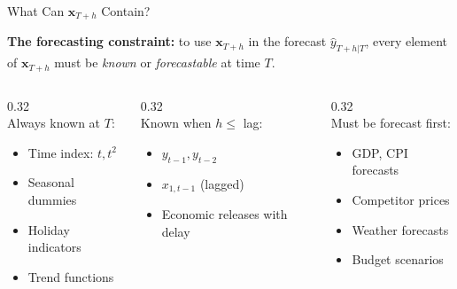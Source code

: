 \documentclass[aspectratio=169, 11pt]{beamer}
\begin{document}
\begin{frame}{What Can $\mathbf{x}_{T+h}$ Contain?}
  \begin{keybox}
    \textbf{The forecasting constraint:} to use $\mathbf{x}_{T+h}$ in the forecast
    $\hat{y}_{T+h|T}$, every element of $\mathbf{x}_{T+h}$ must be
    \emph{known} or \emph{forecastable} at time $T$.
  \end{keybox}
  \vspace{0.2cm}
  \begin{columns}[T]
    \begin{column}{0.32\textwidth}
      \textbf{}\\[4pt]
      Always known at $T$:
      \begin{itemize}
        \item Time index: $t, t^2$
        \item Seasonal dummies
        \item Holiday indicators
        \item Trend functions
      \end{itemize}
    \end{column}
    \begin{column}{0.32\textwidth}
      \textbf{}\\[4pt]
      Known when $h \leq$ lag:
      \begin{itemize}
        \item $y_{t-1}, y_{t-2}$
        \item $x_{1,t-1}$ (lagged)
        \item Economic releases
              with delay
      \end{itemize}
    \end{column}
    \begin{column}{0.32\textwidth}
      \textbf{}\\[4pt]
      Must be forecast first:
      \begin{itemize}
        \item GDP, CPI forecasts
        \item Competitor prices
        \item Weather forecasts
        \item Budget scenarios
      \end{itemize}
    \end{column}
  \end{columns}
\end{frame}
\end{document}

